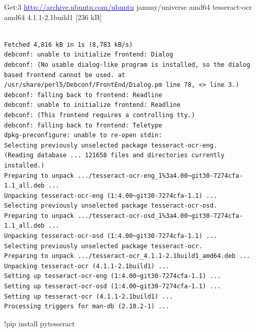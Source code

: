 \documentclass{article}
\begin{document}
Get:3 \href{http://archive.ubuntu.com/ubuntu}{\textcolor{blue}{http://archive.ubuntu.com/ubuntu}} jammy/universe amd64 tesseract-ocr amd64 4.1.1-2.1build1 [236 kB]
\begin{verbatim}

Fetched 4,816 kB in 1s (8,783 kB/s)
debconf: unable to initialize frontend: Dialog
debconf: (No usable dialog-like program is installed, so the dialog based frontend cannot be used. at /usr/share/perl5/Debconf/FrontEnd/Dialog.pm line 78, <> line 3.)
debconf: falling back to frontend: Readline
debconf: unable to initialize frontend: Readline
debconf: (This frontend requires a controlling tty.)
debconf: falling back to frontend: Teletype
dpkg-preconfigure: unable to re-open stdin: 
Selecting previously unselected package tesseract-ocr-eng.
(Reading database ... 121658 files and directories currently installed.)
Preparing to unpack .../tesseract-ocr-eng_1%3a4.00~git30-7274cfa-1.1_all.deb ...
Unpacking tesseract-ocr-eng (1:4.00~git30-7274cfa-1.1) ...
Selecting previously unselected package tesseract-ocr-osd.
Preparing to unpack .../tesseract-ocr-osd_1%3a4.00~git30-7274cfa-1.1_all.deb ...
Unpacking tesseract-ocr-osd (1:4.00~git30-7274cfa-1.1) ...
Selecting previously unselected package tesseract-ocr.
Preparing to unpack .../tesseract-ocr_4.1.1-2.1build1_amd64.deb ...
Unpacking tesseract-ocr (4.1.1-2.1build1) ...
Setting up tesseract-ocr-eng (1:4.00~git30-7274cfa-1.1) ...
Setting up tesseract-ocr-osd (1:4.00~git30-7274cfa-1.1) ...
Setting up tesseract-ocr (4.1.1-2.1build1) ...
Processing triggers for man-db (2.10.2-1) ...
\end{verbatim}

!pip install pytesseract
\end{document}
